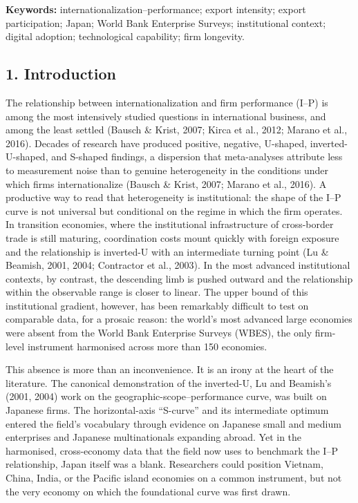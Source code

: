 \documentclass[
  12pt,a4paper]{article}
\begin{document}
\textbf{Keywords:} internationalization--performance; export intensity;
export participation; Japan; World Bank Enterprise Surveys;
institutional context; digital adoption; technological capability; firm
longevity.

\hypertarget{introduction}{%
\subsection{1. Introduction}\label{introduction}}

The relationship between internationalization and firm performance
(I--P) is among the most intensively studied questions in international
business, and among the least settled (Bausch \& Krist, 2007; Kirca et
al., 2012; Marano et al., 2016). Decades of research have produced
positive, negative, U-shaped, inverted-U-shaped, and S-shaped findings,
a dispersion that meta-analyses attribute less to measurement noise than
to genuine heterogeneity in the conditions under which firms
internationalize (Bausch \& Krist, 2007; Marano et al., 2016). A
productive way to read that heterogeneity is institutional: the shape of
the I--P curve is not universal but conditional on the regime in which
the firm operates. In transition economies, where the institutional
infrastructure of cross-border trade is still maturing, coordination
costs mount quickly with foreign exposure and the relationship is
inverted-U with an intermediate turning point (Lu \& Beamish, 2001,
2004; Contractor et al., 2003). In the most advanced institutional
contexts, by contrast, the descending limb is pushed outward and the
relationship within the observable range is closer to linear. The upper
bound of this institutional gradient, however, has been remarkably
difficult to test on comparable data, for a prosaic reason: the world's
most advanced large economies were absent from the World Bank Enterprise
Surveys (WBES), the only firm-level instrument harmonised across more
than 150 economies.

This absence is more than an inconvenience. It is an irony at the heart
of the literature. The canonical demonstration of the inverted-U, Lu and
Beamish's (2001, 2004) work on the geographic-scope--performance curve,
was built on Japanese firms. The horizontal-axis ``S-curve'' and its
intermediate optimum entered the field's vocabulary through evidence on
Japanese small and medium enterprises and Japanese multinationals
expanding abroad. Yet in the harmonised, cross-economy data that the
field now uses to benchmark the I--P relationship, Japan itself was a
blank. Researchers could position Vietnam, China, India, or the Pacific
island economies on a common instrument, but not the very economy on
which the foundational curve was first drawn.
\end{document}
